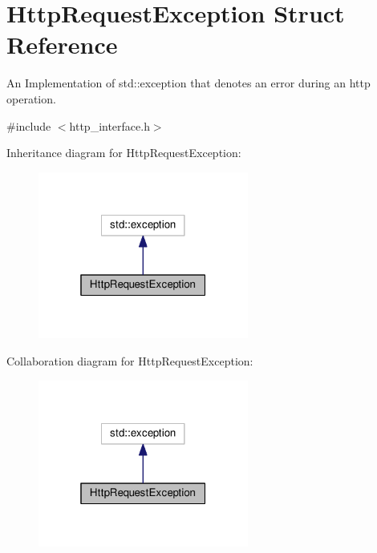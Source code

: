 \hypertarget{structHttpRequestException}{}\section{Http\+Request\+Exception Struct Reference}
\label{structHttpRequestException}


An Implementation of std\+::exception that denotes an error during an http operation.  




{\ttfamily \#include $<$http\+\_\+interface.\+h$>$}



Inheritance diagram for Http\+Request\+Exception\+:\nopagebreak
\begin{figure}[H]
\begin{center}
\leavevmode
\includegraphics[width=196pt]{structHttpRequestException__inherit__graph}
\end{center}
\end{figure}


Collaboration diagram for Http\+Request\+Exception\+:\nopagebreak
\begin{figure}[H]
\begin{center}
\leavevmode
\includegraphics[width=196pt]{structHttpRequestException__coll__graph}
\end{center}
\end{figure}
